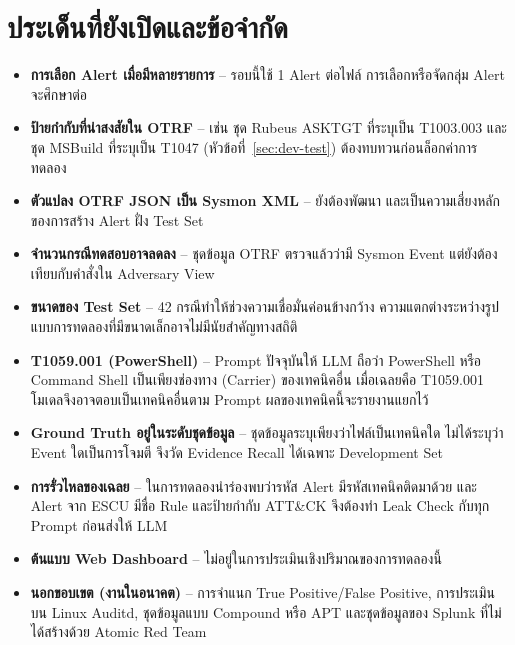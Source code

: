 \section{ประเด็นที่ยังเปิดและข้อจำกัด}
\begin{itemize}
  \item \textbf{การเลือก Alert เมื่อมีหลายรายการ} -- รอบนี้ใช้ 1 Alert ต่อไฟล์ การเลือกหรือจัดกลุ่ม Alert จะศึกษาต่อ
  \item \textbf{ป้ายกำกับที่น่าสงสัยใน OTRF} -- เช่น ชุด Rubeus ASKTGT ที่ระบุเป็น T1003.003
        และชุด MSBuild ที่ระบุเป็น T1047 (หัวข้อที่~\ref{sec:dev-test}) ต้องทบทวนก่อนล็อกค่าการทดลอง
  \item \textbf{ตัวแปลง OTRF JSON เป็น Sysmon XML} -- ยังต้องพัฒนา และเป็นความเสี่ยงหลักของการสร้าง Alert ฝั่ง Test Set
  \item \textbf{จำนวนกรณีทดสอบอาจลดลง} -- ชุดข้อมูล OTRF ตรวจแล้วว่ามี Sysmon Event
        แต่ยังต้องเทียบกับคำสั่งใน Adversary View
  \item \textbf{ขนาดของ Test Set} -- 42 กรณีทำให้ช่วงความเชื่อมั่นค่อนข้างกว้าง
        ความแตกต่างระหว่างรูปแบบการทดลองที่มีขนาดเล็กอาจไม่มีนัยสำคัญทางสถิติ
  \item \textbf{T1059.001 (PowerShell)} -- Prompt ปัจจุบันให้ LLM ถือว่า PowerShell หรือ Command Shell
        เป็นเพียงช่องทาง (Carrier) ของเทคนิคอื่น เมื่อเฉลยคือ T1059.001 โมเดลจึงอาจตอบเป็นเทคนิคอื่นตาม Prompt
        ผลของเทคนิคนี้จะรายงานแยกไว้
  \item \textbf{Ground Truth อยู่ในระดับชุดข้อมูล} -- ชุดข้อมูลระบุเพียงว่าไฟล์เป็นเทคนิคใด
        ไม่ได้ระบุว่า Event ใดเป็นการโจมตี จึงวัด Evidence Recall ได้เฉพาะ Development Set
  \item \textbf{การรั่วไหลของเฉลย} -- ในการทดลองนำร่องพบว่ารหัส Alert มีรหัสเทคนิคติดมาด้วย
        และ Alert จาก ESCU มีชื่อ Rule และป้ายกำกับ ATT\&CK
        จึงต้องทำ Leak Check กับทุก Prompt ก่อนส่งให้ LLM
  \item \textbf{ต้นแบบ Web Dashboard} -- ไม่อยู่ในการประเมินเชิงปริมาณของการทดลองนี้
  \item \textbf{นอกขอบเขต (งานในอนาคต)} -- การจำแนก True Positive/False Positive,
        การประเมินบน Linux Auditd, ชุดข้อมูลแบบ Compound หรือ APT
        และชุดข้อมูลของ Splunk ที่ไม่ได้สร้างด้วย Atomic Red Team
\end{itemize}
